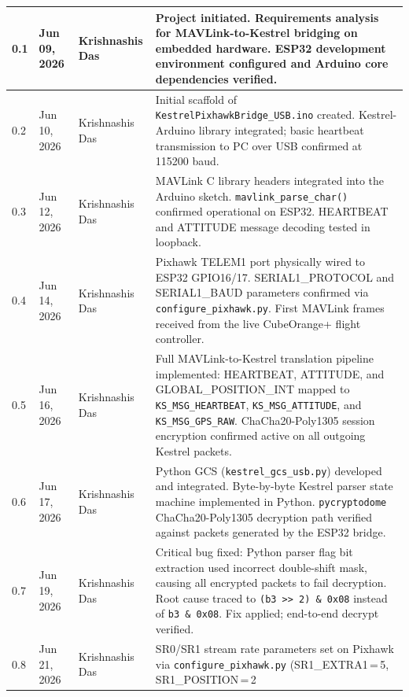 \documentclass[11pt,a4paper]{article}
\begin{document}
\begin{longtable}{@{}p{1.0cm}p{2.6cm}p{3.0cm}p{7.2cm}@{}}
    0.1 & Jun 09, 2026 & Krishnashis Das &
        Project initiated. Requirements analysis for MAVLink-to-Kestrel
        bridging on embedded hardware. ESP32 development environment
        configured and Arduino core dependencies verified. \\
    \midrule
    0.2 & Jun 10, 2026 & Krishnashis Das &
        Initial scaffold of \texttt{KestrelPixhawkBridge\_USB.ino} created.
        Kestrel-Arduino library integrated; basic heartbeat transmission
        to PC over USB confirmed at 115200 baud. \\
    \midrule
    0.3 & Jun 12, 2026 & Krishnashis Das &
        MAVLink C library headers integrated into the Arduino sketch.
        \texttt{mavlink\_parse\_char()} confirmed operational on ESP32.
        HEARTBEAT and ATTITUDE message decoding tested in loopback. \\
    \midrule
    0.4 & Jun 14, 2026 & Krishnashis Das &
        Pixhawk TELEM1 port physically wired to ESP32 GPIO16/17.
        SERIAL1\_PROTOCOL and SERIAL1\_BAUD parameters confirmed
        via \texttt{configure\_pixhawk.py}. First MAVLink frames received
        from the live CubeOrange+ flight controller. \\
    \midrule
    0.5 & Jun 16, 2026 & Krishnashis Das &
        Full MAVLink-to-Kestrel translation pipeline implemented:
        HEARTBEAT, ATTITUDE, and GLOBAL\_POSITION\_INT mapped to
        \texttt{KS\_MSG\_HEARTBEAT}, \texttt{KS\_MSG\_ATTITUDE}, and
        \texttt{KS\_MSG\_GPS\_RAW}. ChaCha20-Poly1305 session
        encryption confirmed active on all outgoing Kestrel packets. \\
    \midrule
    0.6 & Jun 17, 2026 & Krishnashis Das &
        Python GCS (\texttt{kestrel\_gcs\_usb.py}) developed and integrated.
        Byte-by-byte Kestrel parser state machine implemented in Python.
        \texttt{pycryptodome} ChaCha20-Poly1305 decryption path verified
        against packets generated by the ESP32 bridge. \\
    \midrule
    0.7 & Jun 19, 2026 & Krishnashis Das &
        Critical bug fixed: Python parser flag bit extraction used incorrect
        double-shift mask, causing all encrypted packets to fail decryption.
        Root cause traced to \texttt{(b3~>>~2)~\&~0x08} instead of
        \texttt{b3~\&~0x08}. Fix applied; end-to-end decrypt verified. \\
    \midrule
    0.8 & Jun 21, 2026 & Krishnashis Das &
        SR0/SR1 stream rate parameters set on Pixhawk via
        \texttt{configure\_pixhawk.py} (SR1\_EXTRA1\,=\,5, SR1\_POSITION\,=\,2

\end{longtable}
\end{document}
